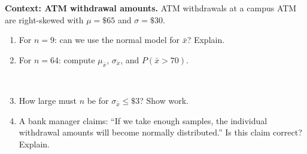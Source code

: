 \documentclass[10pt]{article}
\begin{document}
\vspace{0.15in}

\begin{tcolorbox}[colback=redbg, colframe=black!40, boxrule=0.6pt, arc=2mm,
    left=3mm, right=3mm, top=2mm, bottom=2mm, title=\textbf{Tier E --- Extension}]
\textbf{Context: ATM withdrawal amounts.}
ATM withdrawals at a campus ATM are right-skewed with $\mu = \$65$ and $\sigma = \$30$.

\begin{enumerate}
  \item For $n = 9$: can we use the normal model for $\bar{x}$? Explain.
        \\
  \item For $n = 64$: compute $\mu_{\bar{x}}$, $\sigma_{\bar{x}}$, and $P(\bar{x} > 70)$.
        \par\vspace{-\parskip}\nointerlineskip\noindent\begin{minipage}[t][1.0in][t]{\linewidth}\vspace*{2pt}\\
        \end{minipage}
  \item How large must $n$ be for $\sigma_{\bar{x}} \le \$3$? Show work.
        \par\vspace{-\parskip}\nointerlineskip\noindent\begin{minipage}[t][0.8in][t]{\linewidth}\vspace*{2pt}\end{minipage}
  \item A bank manager claims: ``If we take enough samples, the individual withdrawal amounts
        will become normally distributed.'' Is this claim correct? Explain.
        \\
        \\
\end{enumerate}
\end{tcolorbox}
\end{document}
